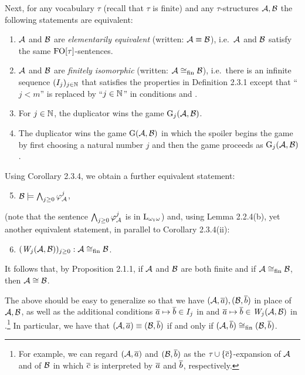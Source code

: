 \begin{enumerate}[1.]
Next, for any vocabulary $\tau$ (recall that $\tau$ is finite) and any $\tau$-structures $\mathcal{A}, \mathcal{B}$ the following statements are equivalent:
\begin{enumerate}[(1)]
\item $\mathcal{A}$ and $\mathcal{B}$ are \emph{elementarily equivalent} (written: $\mathcal{A} \equiv \mathcal{B}$), i.e.\ $\mathcal{A}$ and $\mathcal{B}$ satisfy the same $\folog\of{\tau}$-sentences.
\item $\mathcal{A}$ and $\mathcal{B}$ are \emph{finitely isomorphic} (written: $\mathcal{A} \cong_{\mathrm{fin}} \mathcal{B}$), i.e.\ there is an infinite sequence $(I_j)_{j \in \mathbb{N}}$ that satisfies the properties  in Definition 2.3.1 except that ``$j < m$'' is replaced by ``$j \in \mathbb{N}$'' in conditions  and .
\item For $j \in \mathbb{N}$, the duplicator wins the game $\game{j}(\strct{A}, \strct{B})$.
\item The duplicator wins the game $\mathrm{G}(\mathcal{A}, \mathcal{B})$ in which the spoiler begins the game by first choosing a natural number $j$ and then the game proceeds as $\game{j}(\strct{A}, \strct{B})$.
\end{enumerate}
Using Corollary 2.3.4, we obtain a further equivalent statement:
\begin{enumerate}[(1)]
\setcounter{enumii}{4}
\item $\mathcal{B} \models \bigwedge_{j \geq 0} \varphi^{j}_{\mathcal{A}}$,
\end{enumerate}
(note that the sentence $\bigwedge_{j \geq 0} \varphi^{j}_{\mathcal{A}}$ is in $\dlog{\omega_1}$) and, using Lemma 2.2.4(b), yet another equivalent statement, in parallel to Corollary 2.3.4(ii):
\begin{enumerate}[(1)]
\setcounter{enumii}{5}
\item $\seq{\winpos{j}(\strct{A}, \strct{B})}{j \geq 0} : \strct{A} \isom_\fin \strct{B}$.
\end{enumerate}
It follows that, by Proposition 2.1.1, if $\mathcal{A}$ and $\mathcal{B}$ are both finite and if $\mathcal{A} \cong_{\mathrm{fin}} \mathcal{B}$, then $\mathcal{A} \cong \mathcal{B}$.

The above should be easy to generalize so that we have $(\mathcal{A}, \overline{a}), (\mathcal{B}, \overline{b})$ in place of $\mathcal{A}, \mathcal{B}$, as well as the additional conditions $\overline{a} \mapsto \overline{b} \in I_j$ in  and $\vect{a} \mapsto \vect{b} \in \winpos{j}(\strct{A}, \strct{B})$ in .\footnote{For example, we can regard $(\mathcal{A}, \overline{a})$ and $(\mathcal{B}, \overline{b})$ as the $\tau \mathop{\cup} {\{\overline{c}\}}$-expansion of $\mathcal{A}$ and of $\mathcal{B}$ in which $\overline{c}$ is interpreted by $\overline{a}$ and $\overline{b}$, respectively.} In particular, we have that $(\mathcal{A}, \overline{a}) \equiv (\mathcal{B}, \overline{b})$ if and only if $(\mathcal{A}, \overline{b}) \cong_{\mathrm{fin}} (\mathcal{B}, \overline{b})$.


\end{enumerate}
